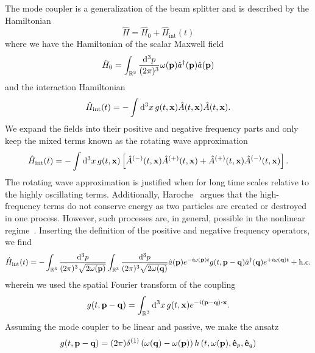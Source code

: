 The mode coupler is a generalization of the beam splitter and is described by the Hamiltonian
\begin{equation}
	\hat{H}
	=
	\hat{H}_0
	+
	\hat{H}_\text{int}(t)
\end{equation}
where we have the Hamiltonian of the scalar Maxwell field
\begin{equation}
	\hat{H}_0
	=
	\int_{\mathbb{R}^3}\frac{\dd[3]{p}}{(2\pi)^3}
	\omega(\vb{p})
	\hat{a}^\dagger(\vb{p})
	\hat{a}(\vb{p})
\end{equation}
and the interaction Hamiltonian
\begin{equation}
	\hat{H}_\text{int}(t)
	=
	-
	\int\dd[3]{x}
	g(t,\vb{x})
	\hat{A}(t,\vb{x})
	\hat{A}(t,\vb{x})
	.
\end{equation}
We expand the fields into their positive and negative frequency parts and only keep the mixed terms known as the rotating wave approximation~\cite[p.~158]{Gardiner2000}
\begin{equation}
	\hat{H}_\text{int}(t)
	=
	-
	\int\dd[3]{x}
	g(t,\vb{x})
	\left[
		\hat{A}^{(-)}(t,\vb{x})
		\hat{A}^{(+)}(t,\vb{x})
		+
		\hat{A}^{(+)}(t,\vb{x})
		\hat{A}^{(-)}(t,\vb{x})
	\right]
	.
\end{equation}
The rotating wave approximation is justified when for long time scales relative to the highly oscillating terms.
Additionally, Haroche~\cite[p.~127]{Haroche2006} argues that the high-frequency terms do not conserve energy as two particles are created or destroyed in one process.
However, such processes are, in general, possible in the nonlinear regime~\cite{QuesadaMejia2015}.
Inserting the definition of the positive and negative frequency operators, we find
\begin{equation}
	\hat{H}_\text{int}(t)
	=
	-
	\int_{\mathbb{R}^3}
	\frac{\dd[3]{p}}{(2\pi)^3\sqrt{2\omega(\vb{p})}}
	\int_{\mathbb{R}^3}
	\frac{\dd[3]{p}}{(2\pi)^3\sqrt{2\omega(\vb{q})}}
	\hat{a}(\vb{p})
	e^{-i\omega(\vb{p})t}
	g(t,\vb{p}-\vb{q})
	\hat{a}^\dagger(\vb{q})
	e^{+i\omega(\vb{q})t}
	+
	\text{h.c.}
\end{equation}
wherein we used the spatial Fourier transform of the coupling
\begin{equation}
	g(t,\vb{p}-\vb{q})
	=
	\int_{\mathbb{R}^3}\dd[3]{x}
	g(t,\vb{x})
	e^{-i(\vb{p}-\vb{q})\vdot\vb{x}}
	.
\end{equation}
Assuming the mode coupler to be linear and passive, we make the ansatz
\begin{equation}
	g(t,\vb{p}-\vb{q})
	=
	(2\pi)
	\delta^{(1)}\left(\omega(\vb{q})-\omega(\vb{p})\right)
	h\left(t,\omega(\vb{p}),\vu{e}_p,\vu{e}_q\right)
\end{equation}
